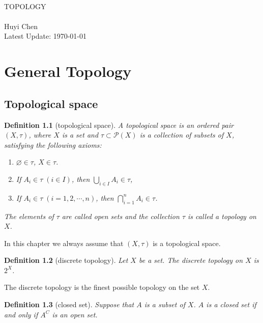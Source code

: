 \documentclass{report}
\newtheorem{definition}{Definition}[section]
\theoremstyle{nonumberplain}
\begin{document}
\begin{center}
	~\\
	\vspace{6em}
	\textsc{\Huge TOPOLOGY}
	~\\
	\vspace{2.5em}
	{\Large }
	~\\
	\vspace{6em}
	\textsf{Huyi Chen}
	~\\
	\vspace{5in}
	{\large Latest Update: \today}
\end{center}
\newpage

\tableofcontents

\chapter{General Topology}
\section{Topological space}
\begin{definition}[topological space]
	A \emph{topological space} is an ordered pair $(X,\tau)$, where $X$ is a set and $\tau\subset\mathcal{P}(X)$ is a collection of subsets of $X$, satisfying the following axioms:
	\begin{enumerate}
		\item $\varnothing\in \tau$, $X\in \tau$.
		\item If $A_i\in\tau\;(i\in I)$, then $\bigcup\limits_{i\in I}A_i\in \tau$,
		\item If $A_i\in\tau\;(i=1,2,\cdots,n)$, then $\bigcap\limits_{i=1}^nA_i\in \tau$.
	\end{enumerate}
	\noindent The elements of $\tau$ are called \emph{open sets} and the collection $\tau$ is called a \emph{topology} on $X$.
\end{definition}

\noindent In this chapter we always assume that $(X,\tau)$ is a topological space.

\begin{definition}[discrete topology]
	Let $X$ be a set. The \emph{discrete topology} on $X$ is $2^X$.
\end{definition}
The discrete topology is the finest possible topology on the set $X$.

\begin{definition}[closed set]
	Suppose that $A$ is a subset of $X$. $A$ is a \emph{closed set} if and only if $A^C$ is an open set.
\end{definition}
\end{document}
